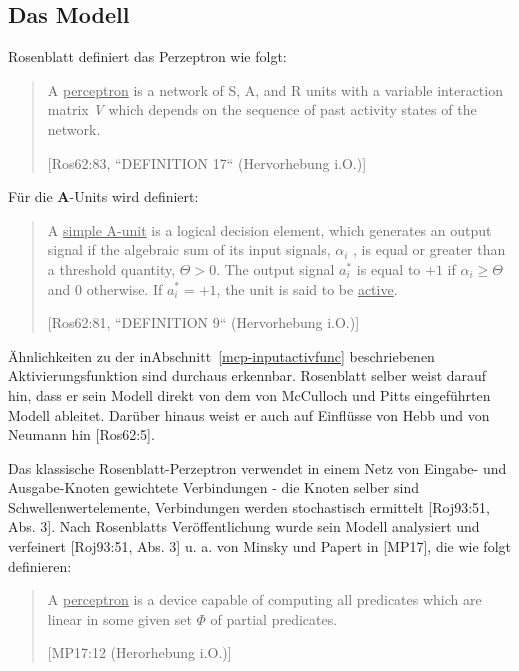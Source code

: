 \subsection{Das Modell}

Rosenblatt definiert das Perzeptron wie folgt\footnotemark[17]:



\blockquote[{[Ros62:83, ``DEFINITION 17`` (Hervorhebung i.O.)]}]{
    A \underline{perceptron} is a network of S, A, and R units with a variable interaction matrix \textit{V} which depends on the
    sequence of past activity states of the network.
}

Für die \textbf{A}-Units wird definiert:

\blockquote[{[Ros62:81, ``DEFINITION 9`` (Hervorhebung i.O.)]}]{
    A \underline{simple A-unit} is a logical decision element, which
    generates an output signal if the algebraic sum of its
    input signals, $\alpha_i$ , is equal or greater than a threshold
    quantity, $\Theta > 0$. The output signal $a^*_i$ is equal to $+1$ if $\alpha_i \geq \Theta$ and $0$ otherwise. If $a^*_i = +1$,
    the unit is said to be \underline{active}.
}


Ähnlichkeiten zu der inAbschnitt~\ref{mcp-inputactivfunc} beschriebenen Aktivierungsfunktion sind durchaus erkennbar.
Rosenblatt selber weist darauf hin, dass er sein Modell direkt von dem von McCulloch und Pitts eingeführten Modell ableitet\footnotemark[18]. Darüber hinaus weist er auch auf Einflüsse von Hebb und von Neumann hin [Ros62:5].\\


Das klassische Rosenblatt-Perzeptron verwendet in einem Netz von Eingabe- und Ausgabe-Knoten gewichtete Verbindungen - die Knoten selber sind Schwellenwertelemente, Verbindungen werden stochastisch ermittelt [Roj93:51, Abs. 3].
Nach Rosenblatts Veröffentlichung wurde sein Modell analysiert und verfeinert [Roj93:51, Abs. 3] u. a. von Minsky und Papert in [MP17], die wie folgt definieren:

\blockquote[{[MP17:12 (Herorhebung i.O.)]}]{
    A \underline{perceptron} is a device capable of computing all predicates which are linear in some given set $\Phi$ of partial predicates.
}


